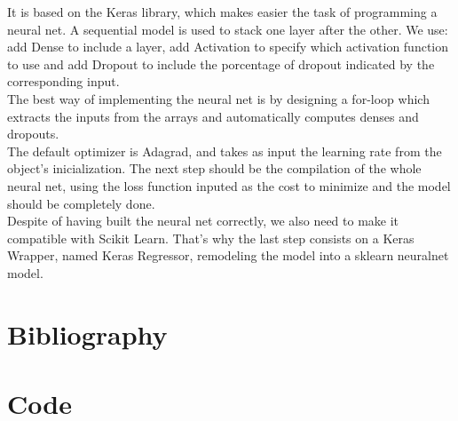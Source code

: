 \documentclass[a4paper,11pt,spanish]{report}
\begin{document}
It is based on the Keras library, which makes easier the task of programming a neural net. A sequential model is used to stack one layer after the other. We use: add Dense to include a layer, add Activation to specify which activation function to use and add Dropout to include the porcentage of dropout indicated by the corresponding input.\\
The best way of implementing the neural net is by designing a for-loop which extracts the inputs from the arrays and automatically computes denses and dropouts.\\
The default optimizer is Adagrad, and takes as input the learning rate from the object's inicialization. The next step should be the compilation of the whole neural net, using the loss function inputed as the cost to minimize and the model should be completely done.\\
Despite of having built the neural net correctly, we also need to make it compatible with Scikit Learn. That's why the last step consists on a Keras Wrapper, named Keras Regressor, remodeling the model into a sklearn neuralnet model.


\chapter*{Bibliography}
\label{chap:bib}

% 


\chapter*{Code}
\label{chap:code}

\end{document}
